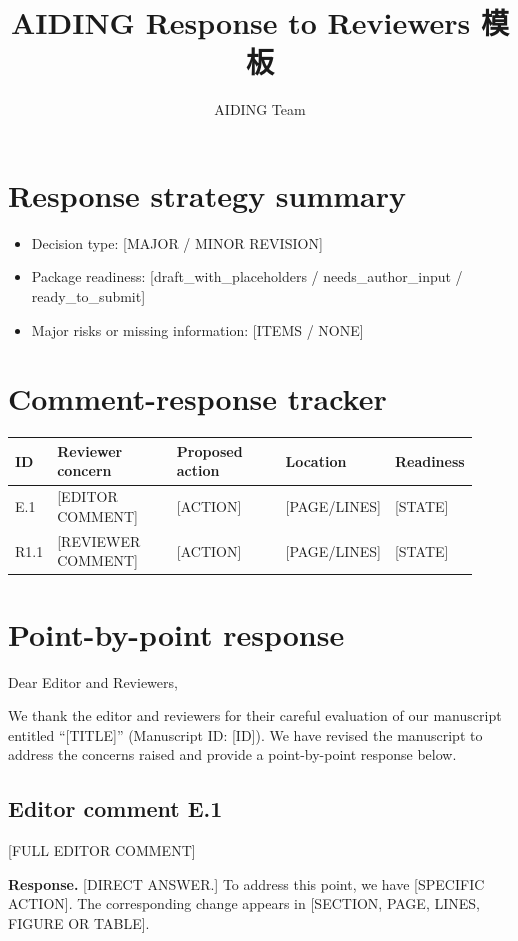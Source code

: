 \documentclass[UTF8,11pt]{ctexart}
\title{\textcolor{aidinggreen}{AIDING Response to Reviewers 模板}}
\author{AIDING Team}
\date{}
\newcommand{\placeholder}[1]{\textcolor{aidinggreen}{[#1]}}
\begin{document}
\maketitle
\section{Response strategy summary}
\begin{itemize}
\item Decision type: \placeholder{MAJOR / MINOR REVISION}
\item Package readiness: \placeholder{draft\_with\_placeholders / needs\_author\_input / ready\_to\_submit}
\item Major risks or missing information: \placeholder{ITEMS / NONE}
\end{itemize}

\section{Comment-response tracker}
\begin{longtable}{p{0.08\linewidth}p{0.27\linewidth}p{0.25\linewidth}p{0.20\linewidth}p{0.12\linewidth}}
\toprule
ID & Reviewer concern & Proposed action & Location & Readiness \\
\midrule
E.1 & \placeholder{EDITOR COMMENT} & \placeholder{ACTION} & \placeholder{PAGE/LINES} & \placeholder{STATE} \\
R1.1 & \placeholder{REVIEWER COMMENT} & \placeholder{ACTION} & \placeholder{PAGE/LINES} & \placeholder{STATE} \\
\bottomrule
\end{longtable}

\section{Point-by-point response}
Dear Editor and Reviewers,

We thank the editor and reviewers for their careful evaluation of our manuscript entitled ``\placeholder{TITLE}'' (Manuscript ID: \placeholder{ID}). We have revised the manuscript to address the concerns raised and provide a point-by-point response below.

\subsection*{Editor comment E.1}
\placeholder{FULL EDITOR COMMENT}

\textbf{Response.} \placeholder{DIRECT ANSWER.} To address this point, we have \placeholder{SPECIFIC ACTION}. The corresponding change appears in \placeholder{SECTION, PAGE, LINES, FIGURE OR TABLE}.
\end{document}
